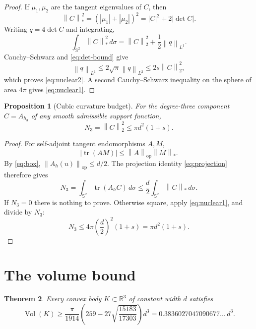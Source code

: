 \documentclass[11pt,reqno]{amsart}
\newtheorem{theorem}{Theorem}[section]
\newtheorem{proposition}[theorem]{Proposition}
\theoremstyle{remark}
\newcommand{\Sph}{\mathbb S^2}
\newcommand{\R}{\mathbb R}
\newcommand{\tr}{\operatorname{tr}}
\newcommand{\Vol}{\operatorname{Vol}}
\newcommand{\op}{\mathrm{op}}
\newcommand{\nuc}{*}
\newcommand{\dd}{\,d\sigma}
\newcommand{\norm}[1]{\left\lVert #1\right\rVert}
\newcommand{\abs}[1]{\left\lvert #1\right\rvert}
\begin{document}
\begin{proof}
If $\mu_1,\mu_2$ are the tangent eigenvalues of $C$, then
\[
 \norm{C}_{\nuc}^2
 = (\abs{\mu_1}+\abs{\mu_2})^2
 =\abs{C}^2+2\abs{\det C}.
\]
Writing $q=4\det C$ and integrating,
\[
 \int_{\Sph}\norm{C}_{\nuc}^2\dd
 =\norm{C}_2^2+\frac12\norm{q}_{L^1}.
\]
Cauchy--Schwarz and \eqref{eq:det-bound} give
\[
 \norm{q}_{L^1}
 \le 2\sqrt\pi\norm{q}_{L^2}
 \le2s\norm{C}_2^2,
\]
which proves \eqref{eq:nuclear2}. A second Cauchy--Schwarz inequality on the
sphere of area $4\pi$ gives \eqref{eq:nuclear1}.
\end{proof}

\begin{proposition}[Cubic curvature budget]\label{prop:cubic-budget}
For the degree-three component $C=A_{h_3}$ of any smooth admissible support
function,
\begin{equation}\label{eq:cubic-budget}
 N_3=\norm{C}_2^2\le\pi d^2(1+s).
\end{equation}
\end{proposition}

\begin{proof}
For self-adjoint tangent endomorphisms $A,M$,
\[
 \abs{\tr(AM)}\le\norm{A}_{\op}\norm{M}_{\nuc}.
\]
By \eqref{eq:box}, $\norm{A_h(u)}_{\op}\le d/2$. The projection identity
\eqref{eq:projection} therefore gives
\[
 N_3=\int_{\Sph}\tr(A_hC)\dd
 \le\frac d2\int_{\Sph}\norm{C}_{\nuc}\dd.
\]
If $N_3=0$ there is nothing to prove. Otherwise square, apply
\eqref{eq:nuclear1}, and divide by $N_3$:
\[
 N_3\le4\pi\left(\frac d2\right)^2(1+s)
 =\pi d^2(1+s).
\]
\end{proof}

\section{The volume bound}

\begin{theorem}\label{thm:main}
Every convex body $K\subset\R^3$ of constant width $d$ satisfies
\begin{equation}\label{eq:main-bound}
 \Vol(K)\ge
 \frac{\pi}{1914}\left(259-27\sqrt{\frac{15183}{17303}}\right)d^3
 =0.3836027047090677\ldots\,d^3.
\end{equation}
\end{theorem}
\end{document}
